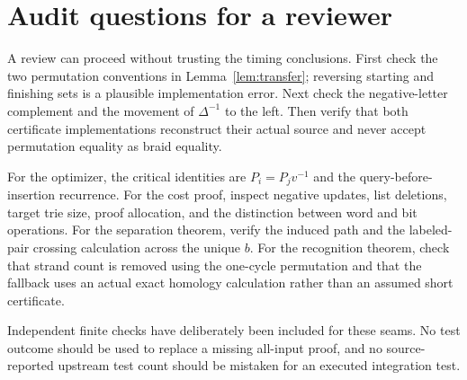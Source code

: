 \documentclass[11pt,a4paper]{article}
\theoremstyle{definition}\newtheorem{definition}[theorem]{Definition}
\theoremstyle{remark}\newtheorem{remark}[theorem]{Remark}
\begin{document}
\section{Audit questions for a reviewer}
A review can proceed without trusting the timing conclusions. First check
the two permutation conventions in Lemma~\ref{lem:transfer}; reversing
starting and finishing sets is a plausible implementation error. Next check
the negative-letter complement and the movement of $\Delta^{-1}$ to the
left. Then verify that both certificate implementations reconstruct their
actual source and never accept permutation equality as braid equality.

For the optimizer, the critical identities are
$P_i=P_jv^{-1}$ and the query-before-insertion recurrence. For the cost
proof, inspect negative updates, list deletions, target trie size, proof
allocation, and the distinction between word and bit operations. For the
separation theorem, verify the induced path and the labeled-pair crossing
calculation across the unique $b$. For the recognition theorem, check that
strand count is removed using the one-cycle permutation and that the
fallback uses an actual exact homology calculation rather than an assumed
short certificate.

Independent finite checks have deliberately been included for these seams.
No test outcome should be used to replace a missing all-input proof, and no
source-reported upstream test count should be mistaken for an executed
integration test.
\end{document}

